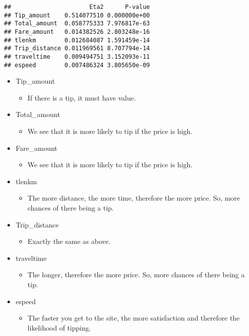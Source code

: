 \documentclass[
  18pt,
  a4paper]{article}
\providecommand{\tightlist}{%
  \setlength{\itemsep}{0pt}\setlength{\parskip}{0pt}}
\begin{document}
\begin{verbatim}
##                      Eta2      P-value
## Tip_amount    0.514077510 0.000000e+00
## Total_amount  0.058775333 7.976817e-63
## Fare_amount   0.014382526 2.803248e-16
## tlenkm        0.012684087 1.591459e-14
## Trip_distance 0.011969561 8.707794e-14
## traveltime    0.009494751 3.152093e-11
## espeed        0.007486324 3.805650e-09
\end{verbatim}

\begin{itemize}
\tightlist
\item
  Tip\_amount

  \begin{itemize}
  \tightlist
  \item
    If there is a tip, it must have value.
  \end{itemize}
\item
  Total\_amount

  \begin{itemize}
  \tightlist
  \item
    We see that it is more likely to tip if the price is high.
  \end{itemize}
\item
  Fare\_amount

  \begin{itemize}
  \tightlist
  \item
    We see that it is more likely to tip if the price is high.
  \end{itemize}
\item
  tlenkm

  \begin{itemize}
  \tightlist
  \item
    The more distance, the more time, therefore the more price. So, more
    chances of there being a tip.
  \end{itemize}
\item
  Trip\_distance

  \begin{itemize}
  \tightlist
  \item
    Exactly the same as above.
  \end{itemize}
\item
  traveltime

  \begin{itemize}
  \tightlist
  \item
    The longer, therefore the more price. So, more chances of there
    being a tip.
  \end{itemize}
\item
  espeed

  \begin{itemize}
  \tightlist
  \item
    The faster you get to the site, the more satisfaction and therefore
    the likelihood of tipping.
  \end{itemize}
\end{itemize}
\end{document}
